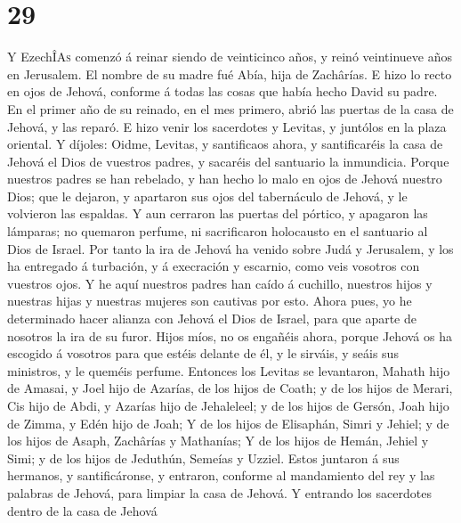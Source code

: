 \hypertarget{section-28}{%
\section{29}\label{section-28}}

 Y EzechÎ\textsc{As} comenzó á reinar siendo de
veinticinco años, y reinó veintinueve años en Jerusalem. El nombre de su
madre fué Abía, hija de Zachârías.  E hizo lo recto en
ojos de Jehová, conforme á todas las cosas que había hecho David su
padre.  En el primer año de su reinado, en el mes primero,
abrió las puertas de la casa de Jehová, y las reparó.  E
hizo venir los sacerdotes y Levitas, y juntólos en la plaza oriental.
 Y díjoles: Oidme, Levitas, y santificaos ahora, y
santificaréis la casa de Jehová el Dios de vuestros padres, y sacaréis
del santuario la inmundicia.  Porque nuestros padres se
han rebelado, y han hecho lo malo en ojos de Jehová nuestro Dios; que le
dejaron, y apartaron sus ojos del tabernáculo de Jehová, y le volvieron
las espaldas.  Y aun cerraron las puertas del pórtico, y
apagaron las lámparas; no quemaron perfume, ni sacrificaron holocausto
en el santuario al Dios de Israel.  Por tanto la ira de
Jehová ha venido sobre Judá y Jerusalem, y los ha entregado á turbación,
y á execración y escarnio, como veis vosotros con vuestros ojos.
 Y he aquí nuestros padres han caído á cuchillo, nuestros
hijos y nuestras hijas y nuestras mujeres son cautivas por esto.
 Ahora pues, yo he determinado hacer alianza con Jehová
el Dios de Israel, para que aparte de nosotros la ira de su furor.
 Hijos míos, no os engañéis ahora, porque Jehová os ha
escogido á vosotros para que estéis delante de él, y le sirváis, y seáis
sus ministros, y le queméis perfume.  Entonces los
Levitas se levantaron, Mahath hijo de Amasai, y Joel hijo de Azarías, de
los hijos de Coath; y de los hijos de Merari, Cis hijo de Abdi, y
Azarías hijo de Jehaleleel; y de los hijos de Gersón, Joah hijo de
Zimma, y Edén hijo de Joah;  Y de los hijos de Elisaphán,
Simri y Jehiel; y de los hijos de Asaph, Zachârías y Mathanías;
 Y de los hijos de Hemán, Jehiel y Simi; y de los hijos
de Jeduthún, Semeías y Uzziel.  Estos juntaron á sus
hermanos, y santificáronse, y entraron, conforme al mandamiento del rey
y las palabras de Jehová, para limpiar la casa de Jehová.
 Y entrando los sacerdotes dentro de la casa de Jehová
